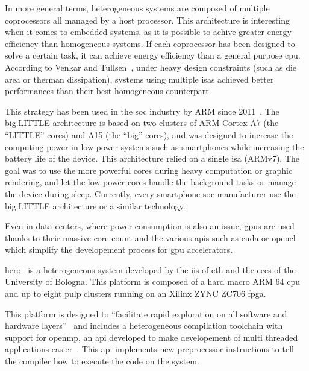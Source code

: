 
	In more general terms, heterogeneous systems are composed of multiple coprocessors all managed by a host processor. This architecture is interesting when it comes to embedded systems, as it is possible to achive greater energy efficiency than homogeneous systems.
	If each coprocessor has been designed to solve a certain task, it can achieve energy efficiency than a general purpose \gls{cpu}. 
	According to Venkar and Tullsen~\cite{Art:Harnessing}, under heavy design constraints (such as die area or therman dissipation), systems using multiple \glspl{isa} achieved better performances than their best homogeneous counterpart.

This strategy has been used in the \gls{soc} industry by ARM since 2011~\cite{Art:bigLITTLE}. The  big.LITTLE architecture is based on two clusters of ARM Cortex A7 (the ``LITTLE'' cores) and A15 (the ``big'' cores), and was designed to increase the computing power in low-power systems such as smartphones while increasing the battery life of the device. This architecture relied on a single \gls{isa} (ARMv7). The goal was to use the more powerful cores during heavy computation or graphic rendering, and let the low-power cores handle the background tasks or manage the device during sleep.
	Currently, every smartphone \gls{soc} manufacturer use the big.LITTLE architecture or a similar technology.


Even in data centers, where power consumption is also an issue, \glspl{gpu} are used thanks to their massive core count and the various \glspl{api} such as \gls{cuda} or \gls{opencl} which simplify the developement process for \gls{gpu} accelerators.

    \gls{hero}~\cite{Art:Hero} is a heterogeneous system developed by the \gls{iis} of \acrshort{eth} and the \gls{eees} of the University of Bologna.
	This platform is composed of a hard macro ARM 64 \gls{cpu} and up to eight \gls{pulp} clusters running on an Xilinx ZYNC ZC706 \gls{fpga}.

    This platform is designed to ``facilitate rapid exploration on all software and hardware layers''~\cite{Art:Hero} and includes a heterogeneous compilation toolchain with support for \gls{openmp}, an \gls{api} developed to make developement of multi threaded applications easier~\cite{Web:OpenMPFaq}. This \gls{api} implements new preprocessor instructions to tell the compiler how to execute the code on the system.



